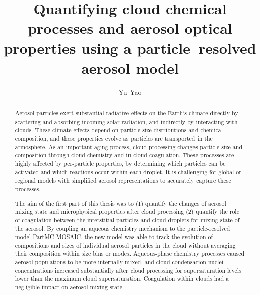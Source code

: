 \documentclass[edeposit,fullpage]{uiucthesis2009}
\begin{document}
\title{Quantifying cloud chemical processes and aerosol optical properties using a particle--resolved aerosol model}
\author{Yu Yao}
\phdthesis
{}
\maketitle


\frontmatter

\begin{abstract}
Aerosol particles exert substantial radiative effects on the Earth's
climate directly by scattering and absorbing incoming solar radiation,
and indirectly by interacting with clouds. These climate effects
depend on particle size distributions and chemical composition, and
these properties evolve as particles are transported in the
atmosphere. As an important aging process, cloud processing changes
particle size and composition through cloud chemistry and in-cloud
coagulation. These processes are highly affected by per-particle
properties, by determining which particles can be activated and which
reactions occur within each droplet. It is challenging for global or
regional models with simplified aerosol representations to accurately
capture these processes.

The aim of the first part of this thesis was to (1) quantify the
changes of aerosol mixing state and microphysical properties after
cloud processing (2) quantify the role of coagulation between the
interstitial particles and cloud droplets for mixing state of the
aerosol. By coupling an aqueous chemistry mechanism to the
particle-resolved model PartMC-MOSAIC, the new model was able to track
the evolution of compositions and sizes of individual aerosol
particles in the cloud without averaging their composition within size
bins or modes. Aqueous-phase chemistry processes caused aerosol
populations to be more internally mixed, and cloud condensation nuclei
concentrations increased substantially after cloud processing for
supersaturation levels lower than the maximum cloud
supersaturation. Coagulation within clouds had a negligible impact on
aerosol mixing state.


\end{abstract}
\end{document}
